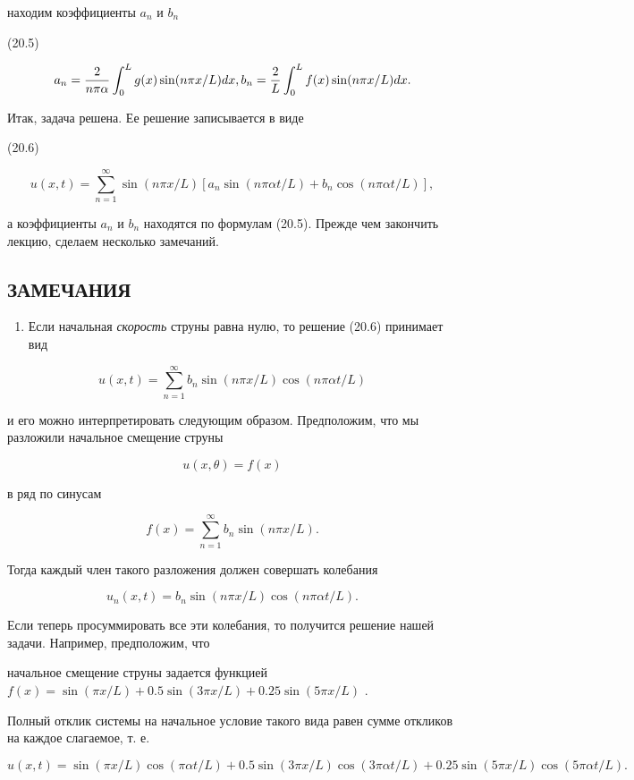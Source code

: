 \documentclass[
  ukrainian,
]{article}
\providecommand{\tightlist}{%
  \setlength{\itemsep}{0pt}\setlength{\parskip}{0pt}}
\begin{document}
находим коэффициенты \(a_n\) и \(b_n\)

(20.5)

\[
a_{n} = \frac{2}{n\pi\alpha} \int_{0}^{L} g(x) \sin(n\pi x/L) dx, \\ b_{n} = \frac{2}{L} \int_{0}^{L} f(x) \sin(n\pi x/L) dx.
\]

Итак, задача решена. Ее решение записывается в виде

(20.6)

\[
u(x, t) = \sum_{n=1}^{\infty} \sin(n\pi x/L) \left[ a_n \sin(n\pi \alpha t/L) + b_n \cos(n\pi \alpha t/L) \right],
\]

а коэффициенты \(a_n\) и \(b_n\) находятся по формулам (20.5). Прежде
чем закончить лекцию, сделаем несколько замечаний.

\subsection{ЗАМЕЧАНИЯ}\label{ux437ux430ux43cux435ux447ux430ux43dux438ux44f-3}

\begin{enumerate}
\def\labelenumi{\arabic{enumi}.}
\tightlist
\item
  Если начальная \emph{скорость} струны равна нулю, то решение (20.6)
  принимает вид
\end{enumerate}

\[
u(x, t) = \sum_{n=1}^{\infty} b_n \sin(n\pi x/L) \cos(n\pi\alpha t/L)
\]

и его можно интерпретировать следующим образом. Предположим, что мы
разложили начальное смещение струны

\[
u(x, \theta) = f(x)
\]

в ряд по синусам

\[
f(x) = \sum_{n=1}^{\infty} b_n \sin(n\pi x/L).
\]

Тогда каждый член такого разложения должен совершать колебания

\[
u_n(x, t) = b_n \sin(n\pi x/L) \cos(n\pi\alpha t/L).
\]

Если теперь просуммировать все эти колебания, то получится решение нашей
задачи. Например, предположим, что

начальное смещение струны задается функцией
\(f(x) = \sin(\pi x/L) + 0.5 \sin(3\pi x/L) + 0.25 \sin(5\pi x/L)\) .

Полный отклик системы на начальное условие такого вида равен сумме
откликов на каждое слагаемое, т. е.

\[
u(x, t) = \sin(\pi x/L)\cos(\pi \alpha t/L) + 0.5\sin(3\pi x/L)\cos(3\pi \alpha t/L) + 0.25\sin(5\pi x/L)\cos(5\pi \alpha t/L).
\]
\end{document}
